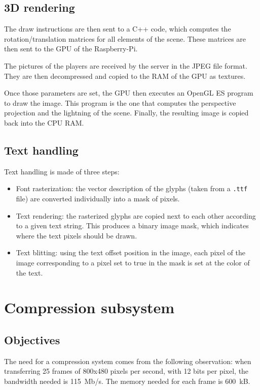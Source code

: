 \documentclass[english, DIV=13]{scrreprt}
\begin{document}
\subsection{3D rendering}

The draw instructions are then sent to a C++ code, which computes the rotation/translation
matrices for all elements of the scene. These matrices are then sent to the GPU of the
Raspberry-Pi.

The pictures of the players are received by the server in the JPEG file format.
They are then decompressed and copied to the RAM of the GPU as textures.

Once those parameters are set, the GPU then executes an OpenGL ES program to draw the
image. This program is the one that computes the perspective projection and the lightning
of the scene.
Finally, the resulting image is copied back into the CPU RAM.

\subsection{Text handling}

Text handling is made of three steps:
\begin{itemize}
    \item Font rasterization: the vector description of the glyphs (taken from a 
    \texttt{.ttf} file) are converted individually into a mask of pixels.
    \item Text rendering: the rasterized glyphs are copied next to each other according
    to a given text string. This produces a binary image mask, which indicates where
    the text pixels should be drawn.
    \item Text blitting: using the text offset position in the image, each pixel of the
    image corresponding to a pixel set to true in the mask is set at the color of the text.
\end{itemize}

\section{Compression subsystem}
\label{sec:compression}

\subsection{Objectives}

The need for a compression system comes from the following observation:
when transferring 25 frames of 800x480 pixels per second, with 12 bits per pixel,
the bandwidth needed is \SI{115}{Mb/s}. The memory needed for each frame
is \SI{600}{kB}.
\end{document}
